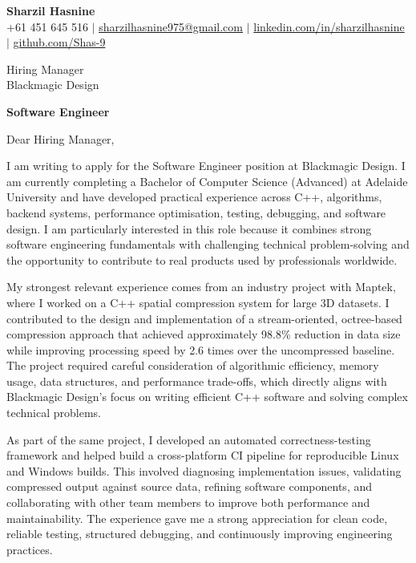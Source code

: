 \documentclass[letterpaper,11pt]{article}
\begin{document}
\begin{center}
    \textbf{\Large Sharzil Hasnine} \\ \vspace{3pt}
    \small +61 451 645 516 $|$ \href{mailto:sharzilhasnine975@gmail.com}{sharzilhasnine975@gmail.com} $|$
    \href{https://www.linkedin.com/in/sharzilhasnine/}{linkedin.com/in/sharzilhasnine} $|$
    \href{https://github.com/Shas-9}{github.com/Shas-9}
\end{center}

\vspace{10pt}


Hiring Manager \\
Blackmagic Design \\

\vspace{5pt}

\textbf{Software Engineer}

Dear Hiring Manager,

I am writing to apply for the Software Engineer position at Blackmagic Design. I am currently completing a Bachelor of Computer Science (Advanced) at Adelaide University and have developed practical experience across C++, algorithms, backend systems, performance optimisation, testing, debugging, and software design. I am particularly interested in this role because it combines strong software engineering fundamentals with challenging technical problem-solving and the opportunity to contribute to real products used by professionals worldwide.

My strongest relevant experience comes from an industry project with Maptek, where I worked on a C++ spatial compression system for large 3D datasets. I contributed to the design and implementation of a stream-oriented, octree-based compression approach that achieved approximately 98.8\% reduction in data size while improving processing speed by 2.6 times over the uncompressed baseline. The project required careful consideration of algorithmic efficiency, memory usage, data structures, and performance trade-offs, which directly aligns with Blackmagic Design's focus on writing efficient C++ software and solving complex technical problems.

As part of the same project, I developed an automated correctness-testing framework and helped build a cross-platform CI pipeline for reproducible Linux and Windows builds. This involved diagnosing implementation issues, validating compressed output against source data, refining software components, and collaborating with other team members to improve both performance and maintainability. The experience gave me a strong appreciation for clean code, reliable testing, structured debugging, and continuously improving engineering practices.
\end{document}
